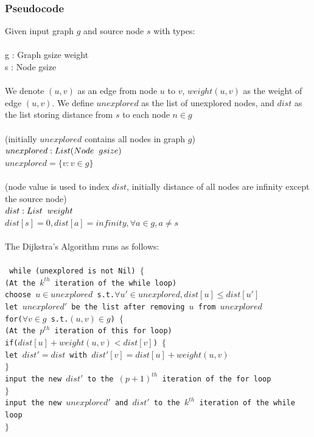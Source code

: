 \documentclass[11pt, a4paper]{article} %
\theoremstyle{definition}
\newcommand\tab[1][1cm]{\hspace*{#1}}
\newcommand\tsp[1][0.2cm]{\hspace*{#1}}
\begin{document}
\subsubsection{Pseudocode}
Given input graph $g$ and source node $s$ with types:
\\\\
  \tab g : Graph gsize weight\\
  \tab s : Node gsize
\\\\
We denote $(u, v)$ as an edge from node $u$ to $v$, $weight(u, v)$ as the weight of edge $(u, v)$. We define $unexplored$ as the list of unexplored nodes, and $dist$ as the list storing distance from $s$ to each node $n \in g$
\\\\
\tab (initially $unexplored$ contains all nodes in graph $g$)\\
\tab $unexplored : List (Node \tsp gsize)$\\
\tab $unexplored = \{v : v \in g\}$
\\\\
\tab (node value is used to index $dist$, initially distance of all nodes are infinity except 
\\ \tab the source node)\\
\tab $dist : List \tsp weight$ \\
\tab $dist[s] = 0, dist[a] = infinity, \forall a \in g, a \neq s$
\\\\
The Dijkstra's Algorithm runs as follows: 
\\\\
\texttt{
  \tab while (unexplored is not Nil) 
  \tab$\{$ \\
  \tab\tab (At the $k^{th}$ iteration of the while loop)                                          \\
  \tab\tab choose $u \in unexplored$ s.t.$\forall u' \in unexplored, dist[u] \leq dist[u']$     \\
  \tab\tab let $unexplored'$ be the list after removing $u$ from $unexplored$                    \\
  \tab\tab for($\forall v \in g$ s.t.$(u, v) \in g$) $\{$                                 \\  
  \tab\tab\tab (At the $p^{th}$ iteration of this for loop)                                \\
  \tab\tab\tab  if($dist[u] + weight(u, v) < dist[v]$) $\{$                              \\
  \tab\tab\tab\tab  let $dist' = dist$ with $dist'[v] = dist[u] + weight(u, v)$          \\
  \tab\tab\tab $\}$ \\ 
  \tab\tab\tab input the new $dist'$ to the $(p+1)^{th}$ iteration of the for loop \\
  \tab\tab $\}$ \\
  \tab\tab input the new $unexplored'$ and $dist'$ to the $k^{th}$ iteration of the while loop \\
  \tab $\}$
}
\end{document}
